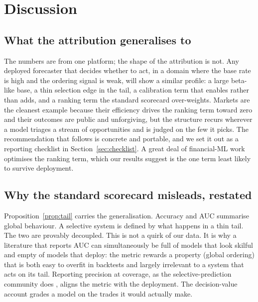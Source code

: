 \documentclass{sbc2023}%
\theoremstyle{definition}
\theoremstyle{plain}
\begin{document}
\section{Discussion}
\label{sec:discussion}
\subsection{What the attribution generalises to}
The numbers are from one platform; the shape of the attribution is not. Any deployed
forecaster that decides whether to act, in a domain where the base rate is high and
the ordering signal is weak, will show a similar profile: a large beta-like base, a
thin selection edge in the tail, a calibration term that enables rather than adds, and
a ranking term the standard scorecard over-weights. Markets are the cleanest example
because their efficiency drives the ranking term toward zero \citep{fama1970,malkiel2003} and their outcomes are public and unforgiving, but the structure recurs
wherever a model triages a stream of opportunities and is judged on the few it picks.
The recommendation that follows is concrete and portable, and we set it out as a
reporting checklist in Section~\ref{sec:checklist}. A great deal of financial-ML work
optimises the ranking term, which our results suggest is the one term least likely to
survive deployment.

\subsection{Why the standard scorecard misleads, restated}
Proposition~\ref{prop:tail} carries the generalisation. Accuracy and AUC summarise
global behaviour. A selective system is defined by what happens in a thin tail. The two
are provably decoupled. This is not a quirk of our data. It is why a
literature that reports AUC can simultaneously be full of models that look skilful and
empty of models that deploy: the metric rewards a property (global ordering) that is
both easy to overfit in backtests \citep{bailey2017,harvey2016} and
largely irrelevant to a system that acts on its tail. Reporting precision at coverage,
as the selective-prediction community does \citep{geifman2017,elyaniv2010}, aligns the metric with the deployment. The decision-value
account grades a model on the trades it would actually make.
\end{document}
